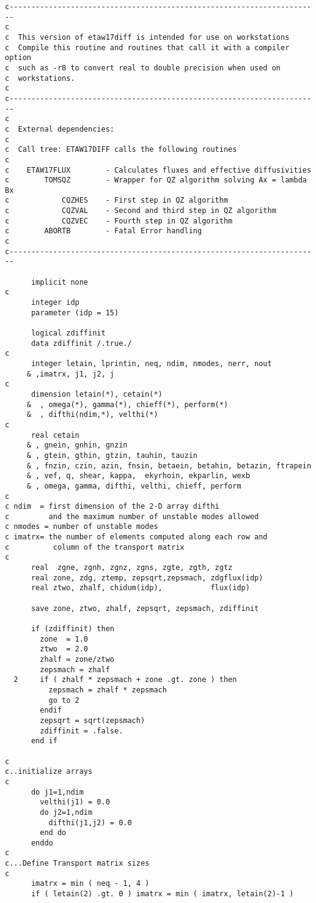 \begin{verbatim}
c-----------------------------------------------------------------------
c
c  This version of etaw17diff is intended for use on workstations
c  Compile this routine and routines that call it with a compiler option 
c  such as -r8 to convert real to double precision when used on 
c  workstations.
c
c-----------------------------------------------------------------------
c
c  External dependencies:
c
c  Call tree: ETAW17DIFF calls the following routines
c
c    ETAW17FLUX        - Calculates fluxes and effective diffusivities
c        TOMSQZ        - Wrapper for QZ algorithm solving Ax = lambda Bx
c            CQZHES    - First step in QZ algorithm 
c            CQZVAL    - Second and third step in QZ algorithm
c            CQZVEC    - Fourth step in QZ algorithm
c        ABORTB        - Fatal Error handling
c
c-----------------------------------------------------------------------

      implicit none
c
      integer idp
      parameter (idp = 15)

      logical zdiffinit
      data zdiffinit /.true./
c
      integer letain, lprintin, neq, ndim, nmodes, nerr, nout
     & ,imatrx, j1, j2, j
c
      dimension letain(*), cetain(*)
     &  , omega(*), gamma(*), chieff(*), perform(*)
     &  , difthi(ndim,*), velthi(*)
c
      real cetain
     & , gnein, gnhin, gnzin
     & , gtein, gthin, gtzin, tauhin, tauzin
     & , fnzin, czin, azin, fnsin, betaein, betahin, betazin, ftrapein
     & , vef, q, shear, kappa,  ekyrhoin, ekparlin, wexb
     & , omega, gamma, difthi, velthi, chieff, perform
c
c ndim  = first dimension of the 2-D array difthi
c         and the maximum number of unstable modes allowed
c nmodes = number of unstable modes
c imatrx= the number of elements computed along each row and
c          column of the transport matrix
c
      real  zgne, zgnh, zgnz, zgns, zgte, zgth, zgtz
      real zone, zdg, ztemp, zepsqrt,zepsmach, zdgflux(idp)
      real ztwo, zhalf, chidum(idp),           flux(idp)

      save zone, ztwo, zhalf, zepsqrt, zepsmach, zdiffinit

      if (zdiffinit) then 
        zone  = 1.0
        ztwo  = 2.0
        zhalf = zone/ztwo
        zepsmach = zhalf
  2     if ( zhalf * zepsmach + zone .gt. zone ) then
          zepsmach = zhalf * zepsmach
          go to 2
        endif
        zepsqrt = sqrt(zepsmach)
        zdiffinit = .false.
      end if

c
c..initialize arrays 
c
      do j1=1,ndim
        velthi(j1) = 0.0
        do j2=1,ndim
          difthi(j1,j2) = 0.0
        end do
      enddo
c
c...Define Transport matrix sizes
c
      imatrx = min ( neq - 1, 4 )
      if ( letain(2) .gt. 0 ) imatrx = min ( imatrx, letain(2)-1 )


\end{verbatim}
